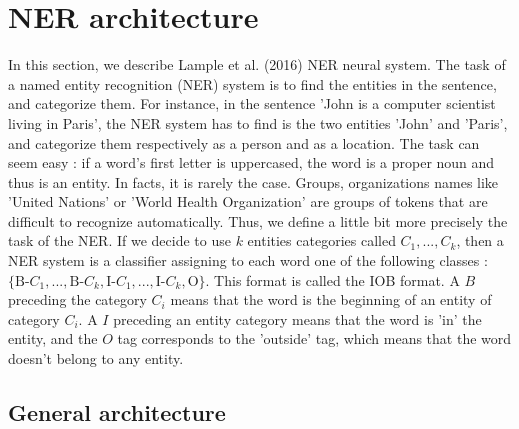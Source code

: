 \documentclass{article}
\begin{document}
\newpage
\section{NER architecture}
In this section, we describe Lample et al. (2016)
 \cite{Lample2016NeuralRecognition} NER neural system.
The task of a named entity recognition (NER) system is 
to find the entities in the sentence, and categorize them.
For instance, in the sentence 'John is a computer scientist living in Paris', 
the NER system has to find is the two entities 'John' and 'Paris', and 
categorize them respectively as a person and as a location. The task 
can seem easy : if a word's first letter is uppercased, the word is 
a proper noun and thus is an entity. In facts, it is rarely the case.
Groups, organizations names like 'United Nations' or 'World Health Organization'
are groups of tokens that are difficult to recognize automatically. Thus, we define 
a little bit more precisely the task of the NER. If we decide to use $k$ entities categories  
 called $C_1, ..., C_k$, then a NER system is a classifier 
assigning to each word one of the following classes : 
$\{\text{B-}C_1, ..., \text{B-}C_k, \text{I-}C_1, ..., \text{I-}C_k, \text{O}\}$. 
This format is called the IOB format. A $B$ preceding the category $C_i$ means that 
the word is the beginning of an entity of category $C_i$. A $I$ preceding an entity category
means that the word is 'in' the entity, and the $O$ tag corresponds to the 'outside'
tag, which means that the word doesn't belong to any entity. \\ \par  

\subsection{General architecture}
\end{document}

